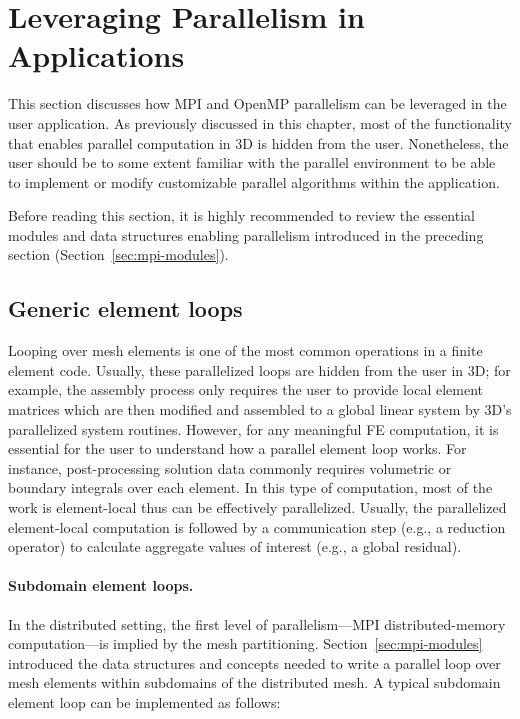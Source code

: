 \section{Leveraging Parallelism in Applications}
\label{sec:leveraging}

This section discusses how MPI and OpenMP parallelism can be leveraged in the user application. As previously discussed in this chapter, most of the functionality that enables parallel computation in \hp3D is hidden from the user. Nonetheless, the user should be to some extent familiar with the parallel environment to be able to implement or modify customizable parallel algorithms within the application.

Before reading this section, it is highly recommended to review the essential modules and data structures enabling parallelism introduced in the preceding section (Section~\ref{sec:mpi-modules}).

\subsection{Generic element loops}
\label{sec:generic-element-loops}

Looping over mesh elements is one of the most common operations in a finite element code. Usually, these parallelized loops are hidden from the user in \hp3D; for example, the assembly process only requires the user to provide local element matrices which are then modified and assembled to a global linear system by \hp3D's parallelized system routines. However, for any meaningful FE computation, it is essential for the user to understand how a parallel element loop works. For instance, post-processing solution data commonly requires volumetric or boundary integrals over each element. In this type of computation, most of the work is element-local thus can be effectively parallelized. Usually, the parallelized element-local computation is followed by a communication step (e.g., a reduction operator) to calculate aggregate values of interest (e.g., a global residual).

\paragraph{Subdomain element loops.}
In the distributed setting, the first level of parallelism---MPI distributed-memory computation---is implied by the mesh partitioning. Section~\ref{sec:mpi-modules} introduced the data structures and concepts needed to write a parallel loop over mesh elements within subdomains of the distributed mesh. A typical subdomain element loop can be implemented as follows:

